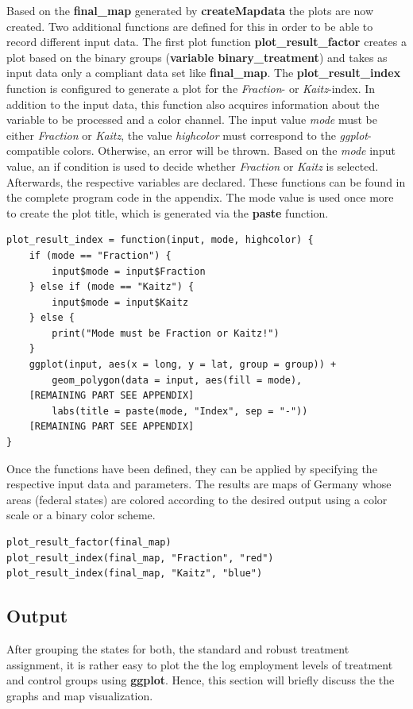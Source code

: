 \documentclass[a4paper]{article}
\begin{document}
{Based on the \textbf{final\_map} generated by \textbf{createMapdata} the plots are now created. Two additional functions are defined for this in order to be able to record different input data. The first plot function \textbf{plot\_result\_factor} creates a plot based on the binary groups (\textbf{variable binary\_treatment}) and takes as input data only a compliant data set like \textbf{final\_map}. The \textbf{plot\_result\_index} function is configured to generate a plot for the \textit{Fraction}- or \textit{Kaitz}-index. In addition to the input data, this function also acquires information about the variable to be processed and a color channel. The input value \textit{mode} must be either \textit{Fraction} or \textit{Kaitz}, the value \textit{highcolor} must correspond to the \textit{ggplot}-compatible colors. Otherwise, an error will be thrown. Based on the \textit{mode} input value, an if condition is used to decide whether \textit{Fraction} or \textit{Kaitz} is selected. Afterwards, the respective variables are declared. 
These functions can be found in the complete program code in the appendix. The mode value is used once more to create the plot title, which is generated via the \textbf{paste} function.

\begin{lstlisting}
plot_result_index = function(input, mode, highcolor) {
    if (mode == "Fraction") {
        input$mode = input$Fraction
    } else if (mode == "Kaitz") {
        input$mode = input$Kaitz
    } else {
        print("Mode must be Fraction or Kaitz!")
    }
    ggplot(input, aes(x = long, y = lat, group = group)) + 
    	geom_polygon(data = input, aes(fill = mode),
    [REMAINING PART SEE APPENDIX]
    	labs(title = paste(mode, "Index", sep = "-"))
    [REMAINING PART SEE APPENDIX]
}
\end{lstlisting}

Once the functions have been defined, they can be applied by specifying the respective input data and parameters. The results are maps of Germany whose areas (federal states) are colored according to the desired output using a color scale or a binary color scheme.
\begin{lstlisting}
plot_result_factor(final_map)
plot_result_index(final_map, "Fraction", "red")
plot_result_index(final_map, "Kaitz", "blue")
\end{lstlisting}

\subsection{Output}
After grouping the states for both, the standard and robust treatment assignment, it is rather easy to plot the the log employment levels of treatment and control groups using \textbf{ggplot}. Hence, this section will briefly discuss the the graphs and map visualization.


}
\end{document}
